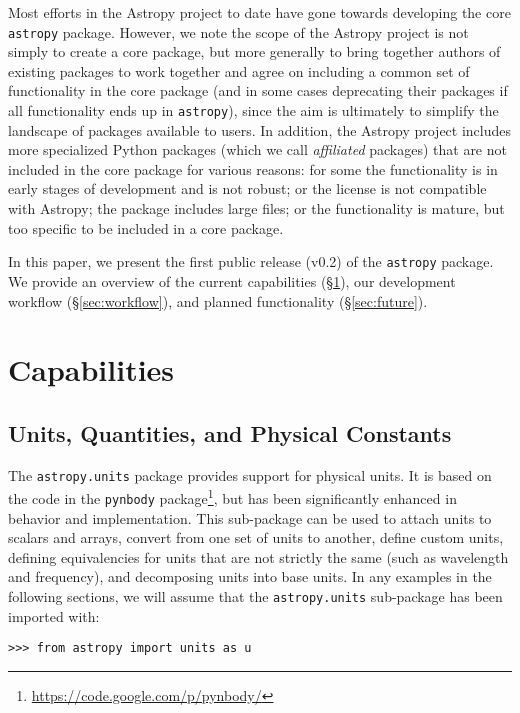 \documentclass[traditabstract]{aa}
\newcommand{\astropy}{\texttt{astropy}\xspace}
\begin{document}
Most efforts in the Astropy project to date have gone towards developing the
core \astropy package. However, we note the scope of the Astropy project is
not simply to create a core package, but more generally to bring together
authors of existing packages to work together and agree on including a common
set of functionality in the core package (and in some cases deprecating their
packages if all functionality ends up in \astropy), since the aim is
ultimately to simplify the landscape of packages available to users. In
addition, the Astropy project includes more specialized Python packages (which
we call \textit{affiliated} packages) that are not included in the core
package for various reasons: for some the functionality is in early stages of
development and is not robust; or the license is not compatible with Astropy;
the package includes large files; or the functionality is mature, but too
specific to be included in a core package.

In this paper, we present the first public release (v0.2) of the \astropy
package. We provide an overview of the current capabilities
(\S\ref{sec:capabilities}), our development workflow (\S\ref{sec:workflow}),
and planned functionality (\S\ref{sec:future}).


\section{Capabilities}

\label{sec:capabilities}

\subsection{Units, Quantities, and Physical Constants}


The \texttt{astropy.units} package provides support for physical units. It is
based on the code in the \texttt{pynbody}
package\footnote{\url{https://code.google.com/p/pynbody/}}, but has been
significantly enhanced in behavior and implementation. This sub-package can be
used to attach units to scalars and arrays, convert from one set of units to
another, define custom units, defining equivalencies for units that are not
strictly the same (such as wavelength and frequency), and decomposing units
into base units. In any examples in the following sections, we will assume
that the \texttt{astropy.units} sub-package has been imported with:
\begin{verbatim}
>>> from astropy import units as u
\end{verbatim}
\end{document}

